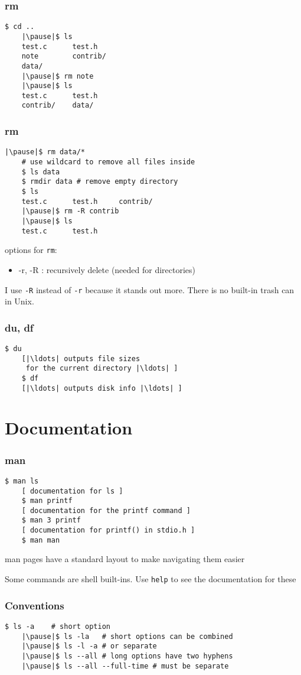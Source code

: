 \documentclass[%
        hyperref={%
                pdfauthor={Zakariyya Mughal},%
                pdfpagemode={None},pdfpagelayout={SinglePage}}%
        xcolor={x11names},%
]{beamer}
\begin{document}
\begin{frame}[fragile]
	\frametitle{rm}
	\begin{lstlisting}[escapeinside=||]
	$ cd ..
	|\pause|$ ls
	test.c      test.h
	note        contrib/
	data/
	|\pause|$ rm note
	|\pause|$ ls
	test.c      test.h
	contrib/    data/
	\end{lstlisting}
\end{frame}
\begin{frame}[fragile]
	\frametitle{rm}
	\begin{lstlisting}[escapeinside=||]
	|\pause|$ rm data/*
	# use wildcard to remove all files inside
	$ ls data
	$ rmdir data # remove empty directory
	$ ls
	test.c      test.h     contrib/
	|\pause|$ rm -R contrib
	|\pause|$ ls
	test.c      test.h
	\end{lstlisting}

	\pause
	options for \texttt{rm}:
	\begin{itemize}
		\item -r, -R : recursively delete (needed for directories)
	\end{itemize}

	I use \texttt{-R} instead of \texttt{-r} because it stands
	out more. There is no built-in trash can in Unix.
\end{frame}
\begin{frame}[fragile]
	\frametitle{du, df}
	\begin{lstlisting}[escapeinside=||]
	$ du
	[|\ldots| outputs file sizes
	 for the current directory |\ldots| ]
	$ df
	[|\ldots| outputs disk info |\ldots| ]
	\end{lstlisting}
\end{frame}

\section{Documentation}\frame{\insertsection}
\begin{frame}[fragile]
	\frametitle{man}
	\begin{lstlisting}[escapeinside=||]
	$ man ls
	[ documentation for ls ]
	$ man printf
	[ documentation for the printf command ]
	$ man 3 printf
	[ documentation for printf() in stdio.h ]
	$ man man
	\end{lstlisting}
	\pause
	man pages have a standard layout to make navigating them
	easier

	\pause Some commands are shell built-ins. Use \texttt{help} to
	see the documentation for these
\end{frame}
\begin{frame}[fragile]
	\frametitle{Conventions}
	\begin{lstlisting}[escapeinside=||]
	$ ls -a    # short option
	|\pause|$ ls -la   # short options can be combined
	|\pause|$ ls -l -a # or separate
	|\pause|$ ls --all # long options have two hyphens
	|\pause|$ ls --all --full-time # must be separate
	\end{lstlisting}
\end{frame}
\end{document}
